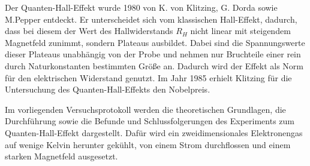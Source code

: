 

Der Quanten-Hall-Effekt wurde 1980 von K. von Klitzing, G. Dorda sowie M.Pepper entdeckt. Er unterscheidet sich vom klassischen Hall-Effekt, dadurch, dass bei diesem der Wert des Hallwiderstands $R_H$ nicht linear mit steigendem Magnetfeld zunimmt, sondern Plateaus ausbildet. Dabei sind die Spannungswerte dieser Plateaus unabhängig von der Probe und nehmen nur Bruchteile einer rein durch Naturkonstanten bestimmten Größe an. Dadurch wird der Effekt als Norm für den elektrischen Widerstand genutzt. Im Jahr 1985 erhielt Klitzing für die Untersuchung des Quanten-Hall-Effekts den Nobelpreis.

Im vorliegenden Versuchsprotokoll werden die theoretischen Grundlagen, die Durchführung sowie die Befunde und Schlussfolgerungen des Experiments zum Quanten-Hall-Effekt dargestellt. Dafür wird ein zweidimensionales Elektronengas auf wenige Kelvin herunter gekühlt, von einem Strom durchflossen und einem starken Magnetfeld ausgesetzt.